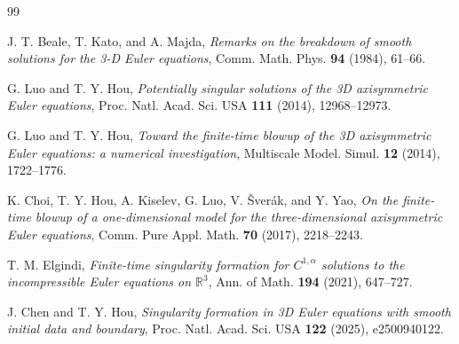 \documentclass[11pt]{article}
\theoremstyle{definition}\newtheorem{definition}[theorem]{Definition}\newtheorem{problem}[theorem]{Problem}
\theoremstyle{remark}\newtheorem{remark}[theorem]{Remark}
\begin{document}
\begin{thebibliography}{99}

J. T. Beale, T. Kato, and A. Majda,
\emph{Remarks on the breakdown of smooth solutions for the 3-D Euler equations},
Comm. Math. Phys. \textbf{94} (1984), 61--66.

G. Luo and T. Y. Hou,
\emph{Potentially singular solutions of the 3D axisymmetric Euler equations},
Proc. Natl. Acad. Sci. USA \textbf{111} (2014), 12968--12973.

G. Luo and T. Y. Hou,
\emph{Toward the finite-time blowup of the 3D axisymmetric Euler equations: a numerical investigation},
Multiscale Model. Simul. \textbf{12} (2014), 1722--1776.

K. Choi, T. Y. Hou, A. Kiselev, G. Luo, V. \v Sver\'ak, and Y. Yao,
\emph{On the finite-time blowup of a one-dimensional model for the three-dimensional axisymmetric Euler equations},
Comm. Pure Appl. Math. \textbf{70} (2017), 2218--2243.

T. M. Elgindi,
\emph{Finite-time singularity formation for $C^{1,\alpha}$ solutions to the incompressible Euler equations on $\mathbb R^3$},
Ann. of Math. \textbf{194} (2021), 647--727.

J. Chen and T. Y. Hou,
\emph{Singularity formation in 3D Euler equations with smooth initial data and boundary},
Proc. Natl. Acad. Sci. USA \textbf{122} (2025), e2500940122.

\end{thebibliography}
\end{document}
